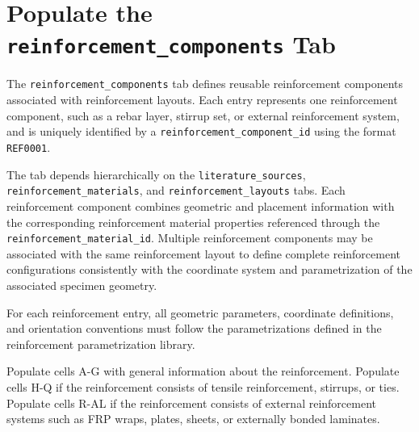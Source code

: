 \documentclass[11pt]{book}
\begin{document}
\section{Populate the \texttt{reinforcement\_components} Tab}



The \texttt{reinforcement\_components} tab defines reusable reinforcement components associated with reinforcement layouts. Each entry represents one reinforcement component, such as a rebar layer, stirrup set, or external reinforcement system, and is uniquely identified by a \texttt{reinforcement\_component\_id} using the format \texttt{REF0001}.

The tab depends hierarchically on the \texttt{literature\_sources}, \texttt{reinforcement\_materials}, and \texttt{reinforcement\_layouts} tabs. Each reinforcement component combines geometric and placement information with the corresponding reinforcement material properties referenced through the \texttt{reinforcement\_material\_id}. Multiple reinforcement components may be associated with the same reinforcement layout to define complete reinforcement configurations consistently with the coordinate system and parametrization of the associated specimen geometry.

For each reinforcement entry, all geometric parameters, coordinate definitions, and orientation conventions must follow the parametrizations defined in the reinforcement parametrization library. 


Populate cells A-G with general information about the reinforcement. Populate cells H-Q if the reinforcement consists of tensile reinforcement, stirrups, or ties. Populate cells R-AL if the reinforcement consists of external reinforcement systems such as FRP wraps, plates, sheets, or externally bonded laminates.
\end{document}
